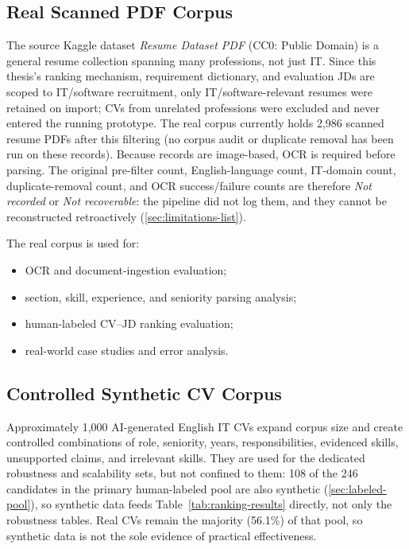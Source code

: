 \documentclass[12pt,a4paper,oneside]{report}
\begin{document}
\subsection{Real Scanned PDF Corpus}
The source Kaggle dataset \emph{Resume Dataset PDF} \citep{hadikpresumepdf} (CC0: Public Domain) is a general resume collection spanning many professions, not just IT. Since this thesis's ranking mechanism, requirement dictionary, and evaluation JDs are scoped to IT/software recruitment, only IT/software-relevant resumes were retained on import; CVs from unrelated professions were excluded and never entered the running prototype. The real corpus currently holds 2,986 scanned resume PDFs after this filtering (no corpus audit or duplicate removal has been run on these records). Because records are image-based, OCR is required before parsing. The original pre-filter count, English-language count, IT-domain count, duplicate-removal count, and OCR success/failure counts are therefore \emph{Not recorded} or \emph{Not recoverable}: the pipeline did not log them, and they cannot be reconstructed retroactively (\cref{sec:limitations-list}).

The real corpus is used for:
\begin{itemize}
  \item OCR and document-ingestion evaluation;
  \item section, skill, experience, and seniority parsing analysis;
  \item human-labeled CV--JD ranking evaluation;
  \item real-world case studies and error analysis.
\end{itemize}

\subsection{Controlled Synthetic CV Corpus}
Approximately 1,000 AI-generated English IT CVs expand corpus size and create controlled combinations of role, seniority, years, responsibilities, evidenced skills, unsupported claims, and irrelevant skills. They are used for the dedicated robustness and scalability sets, but not confined to them: 108 of the 246 candidates in the primary human-labeled pool are also synthetic (\cref{sec:labeled-pool}), so synthetic data feeds Table~\ref{tab:ranking-results} directly, not only the robustness tables. Real CVs remain the majority (56.1\%) of that pool, so synthetic data is not the sole evidence of practical effectiveness.
\end{document}
